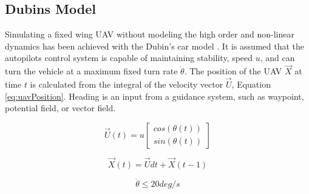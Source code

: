 \documentclass[conf]{new-aiaa}
\begin{document}
\subsection{Dubins Model}
Simulating a fixed wing UAV without modeling the high order and non-linear dynamics has been achieved with the Dubin's car model \cite{frew_cooperative_2007,griffiths_vector_2006,nelson_cooperative_2005,nelson_vector_2006,nelson_vector_2007}. It is assumed that the autopilots control system is capable of maintaining stability, speed $u$, and can turn the vehicle at a maximum fixed turn rate $\dot{\theta}$. The position of the UAV $\overrightarrow{X}$ at time $t$ is calculated from the integral of the velocity vector $\overrightarrow{U}$, Equation \ref{eq:uavPosition}. Heading is an input from a guidance system, such as waypoint, potential field, or vector field.

\begin{equation}
\label{eq:uavVelocity}
\overrightarrow{U}(t) = u \begin{bmatrix}
cos(\theta(t)) \\
sin(\theta(t))
\end{bmatrix}
\end{equation}


\begin{equation}
\label{eq:uavPosition}
\overrightarrow{X}(t) = \overrightarrow{U}dt + \overrightarrow{X}(t-1)
\end{equation}


\begin{equation}
\label{turnRate}
\dot{\theta} \leq 20 deg/s
\end{equation}
\end{document}
